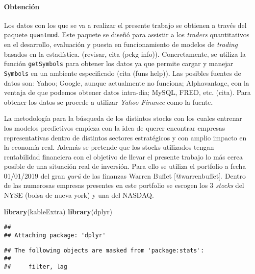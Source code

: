 \documentclass[]{article}
\title{}
\author{}
\date{}
\newenvironment{Shaded}{\begin{snugshade}}{\end{snugshade}}
\newcommand{\KeywordTok}[1]{\textcolor[rgb]{0.13,0.29,0.53}{\textbf{#1}}}
\newcommand{\NormalTok}[1]{#1}
\let\oldparagraph\paragraph
\renewcommand{\paragraph}[1]{\oldparagraph{#1}\mbox{}}
\begin{document}
\hypertarget{obtencion}{%
\paragraph{Obtención}\label{obtencion}}

Los datos con los que se va a realizar el presente trabajo se obtienen a
través del paquete \texttt{quantmod}. Este paquete se diseñó para
assistir a los \emph{traders} quantitativos en el desarrollo, evaluación
y puesta en funcionamiento de modelos de \emph{trading} basados en la
estadística. (revisar, cita (pckg info)). Concretamente, se utiliza la
función \texttt{getSymbols} para obtener los datos ya que permite cargar
y manejar \texttt{Symbols} en un ambiente especificado (cita (funs
help)). Las posibles fuentes de datos son: Yahoo; Google, aunque
actualmente no funciona; Alphavantage, con la ventaja de que podemos
obtener datos intra-dia; MySQL, FRED, etc. (cita). Para obtener los
datos se procede a utilizar \emph{Yahoo Finance} como la fuente.

\setlength\parskip{5ex}

La metodología para la búsqueda de los distintos stocks con los cuales
entrenar los modelos predictivos empieza con la idea de querer encontrar
empresas representativas dentro de distintos sectores estratégicos y con
amplio impacto en la economía real. Además se pretende que los stocks
utilizados tengan rentabilidad financiera con el objetivo de llevar el
presente trabajo lo más cerca posible de una situación real de
inversión. Para ello se utiliza el portfolio a fecha 01/01/2019 del gran
\emph{gurú} de las finanzas Warren Buffet {[}@warrenbuffet{]}. Dentro de
las numerosas empresas presentes en este portfolio se escogen los 3
\emph{stocks} del NYSE (bolsa de nueva york) y una del NASDAQ.

\begin{Shaded}
\begin{Highlighting}[]
\KeywordTok{library}\NormalTok{(kableExtra)}
\KeywordTok{library}\NormalTok{(dplyr)}
\end{Highlighting}
\end{Shaded}

\begin{verbatim}
## 
## Attaching package: 'dplyr'
\end{verbatim}

\begin{verbatim}
## The following objects are masked from 'package:stats':
## 
##     filter, lag
\end{verbatim}
\end{document}
